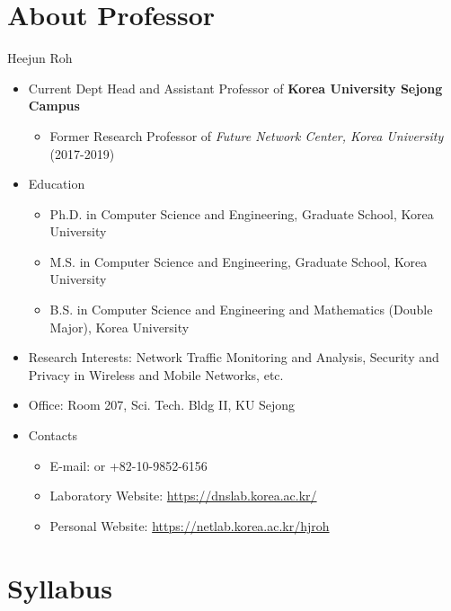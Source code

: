 \titleframe

\section*{About Professor}

\begin{frame}{Heejun Roh}
  \begin{itemize}
  \item Current Dept Head and Assistant Professor of {\bf Korea University Sejong Campus}
    \begin{itemize}
      \item Former Research Professor of {\em Future Network Center, Korea University} (2017-2019)
    \end{itemize}
  \item Education
  \begin{itemize}
    \item Ph.D. in Computer Science and Engineering, Graduate School, Korea University
    \item M.S. in Computer Science and Engineering, Graduate School, Korea University
    \item B.S. in Computer Science and Engineering and Mathematics (Double Major), Korea University
  \end{itemize}  
  \item Research Interests: Network Traffic Monitoring and Analysis, Security and Privacy in Wireless and Mobile Networks, etc.
  \item Office: Room 207, Sci. Tech. Bldg II, KU Sejong
  \item Contacts
    \begin{itemize}
      \item E-mail:  or +82-10-9852-6156
      \item Laboratory Website: \url{https://dnslab.korea.ac.kr/}
      \item Personal Website: \url{https://netlab.korea.ac.kr/hjroh}
    \end{itemize}
  \end{itemize}
\end{frame}

\section*{Syllabus}

